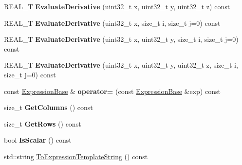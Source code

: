 \begin{DoxyCompactItemize}
\item 
\hypertarget{structatl_1_1_expression_base_aa1f95c771b199c9a7e4b50812c9403bd}{R\+E\+A\+L\+\_\+\+T {\bfseries Evaluate\+Derivative} (uint32\+\_\+t x, uint32\+\_\+t y, uint32\+\_\+t z) const }\label{structatl_1_1_expression_base_aa1f95c771b199c9a7e4b50812c9403bd}

\item 
\hypertarget{structatl_1_1_expression_base_a7e17d01ea0af3917066f0cdd344c0c35}{R\+E\+A\+L\+\_\+\+T {\bfseries Evaluate\+Derivative} (uint32\+\_\+t x, size\+\_\+t i, size\+\_\+t j=0) const }\label{structatl_1_1_expression_base_a7e17d01ea0af3917066f0cdd344c0c35}

\item 
\hypertarget{structatl_1_1_expression_base_aaa68bc54d0a5db9780b0e30df6842047}{R\+E\+A\+L\+\_\+\+T {\bfseries Evaluate\+Derivative} (uint32\+\_\+t x, uint32\+\_\+t y, size\+\_\+t i, size\+\_\+t j=0) const }\label{structatl_1_1_expression_base_aaa68bc54d0a5db9780b0e30df6842047}

\item 
\hypertarget{structatl_1_1_expression_base_a253be8df62a01657fee080feccfe028e}{R\+E\+A\+L\+\_\+\+T {\bfseries Evaluate\+Derivative} (uint32\+\_\+t x, uint32\+\_\+t y, uint32\+\_\+t z, size\+\_\+t i, size\+\_\+t j=0) const }\label{structatl_1_1_expression_base_a253be8df62a01657fee080feccfe028e}

\item 
\hypertarget{structatl_1_1_expression_base_a6607aa1b435c1b21935cca5bceb4ba82}{const \hyperlink{structatl_1_1_expression_base}{Expression\+Base} \& {\bfseries operator=} (const \hyperlink{structatl_1_1_expression_base}{Expression\+Base} \&exp) const }\label{structatl_1_1_expression_base_a6607aa1b435c1b21935cca5bceb4ba82}

\item 
\hypertarget{structatl_1_1_expression_base_a65be9dccfdbecea0460627d628a533e7}{size\+\_\+t {\bfseries Get\+Columns} () const }\label{structatl_1_1_expression_base_a65be9dccfdbecea0460627d628a533e7}

\item 
\hypertarget{structatl_1_1_expression_base_af1bef71d83cb5cbe01a1b63b041d8563}{size\+\_\+t {\bfseries Get\+Rows} () const }\label{structatl_1_1_expression_base_af1bef71d83cb5cbe01a1b63b041d8563}

\item 
\hypertarget{structatl_1_1_expression_base_a83b116cac0f598f22a2342cc2fdb7214}{bool {\bfseries Is\+Scalar} () const }\label{structatl_1_1_expression_base_a83b116cac0f598f22a2342cc2fdb7214}

\item 
std\+::string \hyperlink{structatl_1_1_expression_base_a8bb3985f35c1f4b805dd7658127cc85c}{To\+Expression\+Template\+String} () const 
\end{DoxyCompactItemize}


